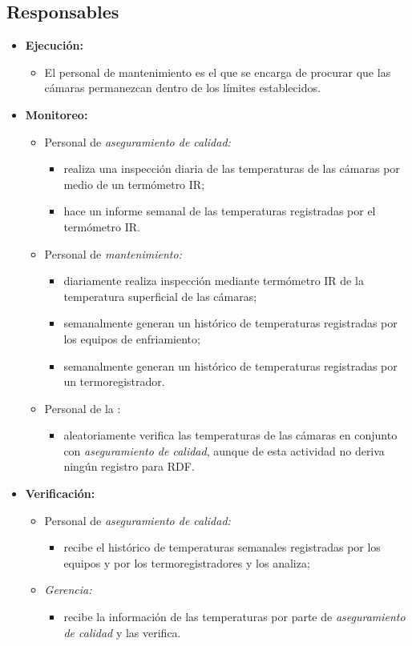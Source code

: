 \subsection{Responsables}

\begin{itemize}
	\item \textbf{Ejecución:}
	\begin{itemize}
		\item El personal de mantenimiento es el que se encarga de procurar que las cámaras permanezcan dentro de los límites establecidos.
	\end{itemize}
	\item \textbf{Monitoreo:}
	\begin{itemize}
		\item Personal de \emph{aseguramiento de calidad:}
		\begin{itemize}
			\item realiza una inspección diaria de las temperaturas de las cámaras por medio de un termómetro IR;
			\item hace un informe semanal de las temperaturas registradas por el termómetro IR.
		\end{itemize}
		\item Personal de \emph{mantenimiento:}
		\begin{itemize}
			\item diariamente realiza inspección mediante termómetro IR de la temperatura superficial de las cámaras;
			\item semanalmente generan un histórico de temperaturas registradas por los equipos de enfriamiento;
			\item semanalmente generan un histórico de temperaturas registradas por un termoregistrador.
		\end{itemize}
		\item Personal de la :
		\begin{itemize}
			\item aleatoriamente verifica las temperaturas de las cámaras en conjunto con \emph{aseguramiento de calidad}, aunque de esta actividad no deriva ningún registro para \gls{RDF}.
		\end{itemize}
	\end{itemize}
	\item \textbf{Verificación:}
	\begin{itemize}
		\item Personal de \emph{aseguramiento de calidad:}
		\begin{itemize}
			\item recibe el histórico de temperaturas semanales registradas por los equipos y por los termoregistradores y los analiza;
		\end{itemize}
		\item \emph{Gerencia:}
		\begin{itemize}
			\item recibe la información de las temperaturas por parte de \emph{aseguramiento de calidad} y las verifica.
		\end{itemize}
	\end{itemize}
\end{itemize}

